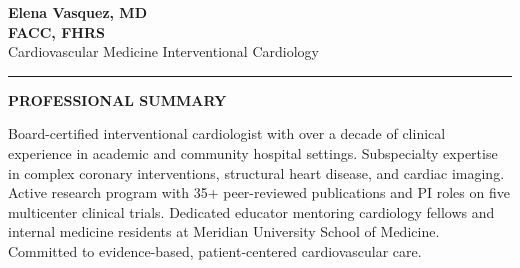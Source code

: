 \documentclass[11pt,a4paper]{article}
\newcommand{\cvsection}[1]{%
  \vspace{1.2em}%
  \noindent
  {\color{primary}\rule{3.5pt}{15pt}}\hspace{8pt}%
  {\color{primary}\Large\bfseries\MakeUppercase{#1}}%
  \vspace{0.2em}%
  \par\noindent{\color{primary!25}\rule{\textwidth}{0.5pt}}%
  \vspace{0.6em}%
}
\begin{document}
\thispagestyle{empty}
\begin{tcolorbox}[
  colback=primary,
  colframe=primary,
  width=\textwidth,
  boxrule=0pt,
  arc=0pt,
  left=0pt, right=0pt, top=14pt, bottom=10pt,
  after skip=0pt,
  before skip=0pt
]
  \centering
  {\color{white}\fontsize{26}{30}\selectfont\bfseries Elena Vasquez, MD}\\[3pt]
  {\color{accent}\large\bfseries FACC, FHRS}\\[2pt]
  {\color{white!85}\normalsize Cardiovascular Medicine \textbar{} Interventional Cardiology}
\end{tcolorbox}

\vspace{8pt}

\noindent
\begin{minipage}[t]{0.25\textwidth}
  \centering
  \faEnvelope{}
\end{minipage}%
\begin{minipage}[t]{0.25\textwidth}
  \centering
  \faPhone{}
\end{minipage}%
\begin{minipage}[t]{0.25\textwidth}
  \centering
  \faMapMarker*{}
\end{minipage}%
\begin{minipage}[t]{0.25\textwidth}
  \centering
  \faLinkedin{}
\end{minipage}
\par

\vspace{8pt}
\noindent{\color{primary!25}\rule{\textwidth}{1.2pt}}
\vspace{4pt}
\noindent{\color{accent!40}\rule{\textwidth}{0.3pt}}

\cvsection{Professional Summary}

\noindent\color{darktext}
Board-certified interventional cardiologist with over a decade of clinical experience in academic and community hospital settings. Subspecialty expertise in complex coronary interventions, structural heart disease, and cardiac imaging. Active research program with 35+ peer-reviewed publications and PI roles on five multicenter clinical trials. Dedicated educator mentoring cardiology fellows and internal medicine residents at Meridian University School of Medicine. Committed to evidence-based, patient-centered cardiovascular care.
\end{document}
